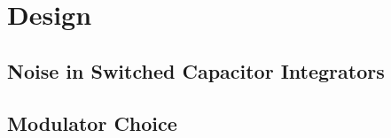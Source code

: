 \section{Design}
\label{Design}

\subsection{Noise in  Switched Capacitor Integrators}
\label{Design:noise}

\subsection{Modulator Choice}






